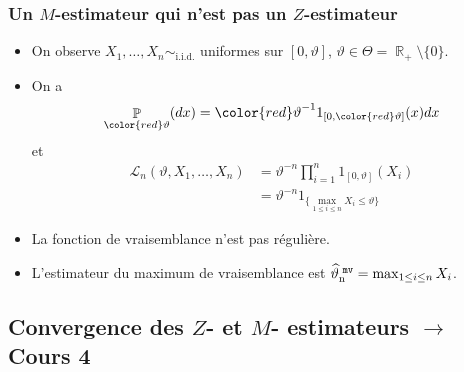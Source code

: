 ﻿\documentclass{beamer}
\DeclareMathOperator{\R}{{\mathbb R}}
\DeclareMathOperator{\PP}{{\mathbb P}}
\DeclareMathOperator{\estMV}{\widehat \vartheta_n^{\,\,{\tt mv}}}
\begin{document}
\begin{frame}
\frametitle{Un $M$-estimateur qui n'est pas un $Z$-estimateur}
\begin{itemize}
\item On observe $X_1,\ldots, X_n\sim_{\text{i.i.d}.}$ uniformes sur $[0,\vartheta]$, $\vartheta \in \Theta = \R_+\setminus \{0\}$.
\item On a $$\PP_{\color{red}\vartheta}(dx) = {\color{red}\vartheta}^{-1}1_{[0,{\color{red}\vartheta}]}(x)dx$$
et
\begin{align*}
{\mathcal L}_n(\vartheta, X_1,\ldots, X_n)& = \vartheta^{-n}\prod_{i = 1}^n 1_{[0,\vartheta]}(X_i) \\
& = \vartheta^{-n}1_{\{\max_{1 \leq i \leq n} X_i \leq \vartheta\}}
\end{align*}
\item La fonction de vraisemblance {\color{red}n'est pas régulière}.
\item {\color{red}L'estimateur du maximum de vraisemblance est}
$\estMV = \max_{1 \leq i \leq n}X_i$. %
\end{itemize}
\end{frame}

%

\subsection{Convergence des $Z$- et $M$- estimateurs $\rightarrow$
Cours 4}


\end{document}
